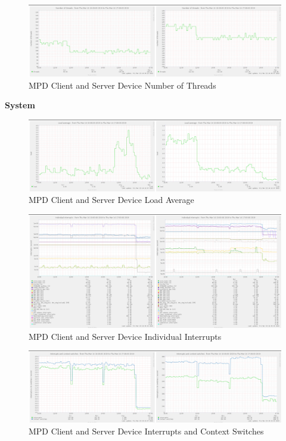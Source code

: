\documentclass[11pt,a4paper,headinclude=false,footinclude=false]{scrreprt}
\begin{document}
\begin{figure}[H]
\includegraphics{ResultsAndAnalysis/MPDServerTestImages/018MPDNoOfThreads.png}
\centering
\caption{MPD Client and Server Device Number of Threads}
\label{MPDNumThreads}
\end{figure}

\textbf{System}

\begin{figure}[H]
\includegraphics{ResultsAndAnalysis/MPDServerTestImages/015MPDLoadAverage.png}
\centering
\caption{MPD Client and Server Device Load Average}
\label{MPDLoadAvg}
\end{figure}

\begin{figure}[H]
\includegraphics{ResultsAndAnalysis/MPDServerTestImages/013MPDIndividualInterrupts.png}
\centering
\caption{MPD Client and Server Device Individual Interrupts}
\label{MPDIndInt}
\end{figure}

\begin{figure}[H]
\includegraphics{ResultsAndAnalysis/MPDServerTestImages/014MPDInterruptsAndContextSwitches.png}
\centering
\caption{MPD Client and Server Device Interrupts and Context Switches}
\label{MPDIntCont}
\end{figure}
\end{document}
